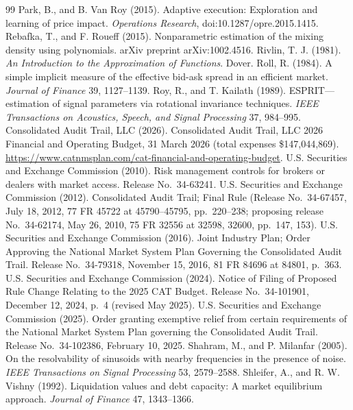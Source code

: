 \documentclass[12pt]{article}
\theoremstyle{definition}
\theoremstyle{remark}
\begin{document}
\begin{thebibliography}{99}
 Park, B., and B. Van Roy (2015). Adaptive execution: Exploration and learning of price impact. \emph{Operations Research}, doi:10.1287/opre.2015.1415.
 Rebafka, T., and F. Roueff (2015). Nonparametric estimation of the mixing density using polynomials. arXiv preprint arXiv:1002.4516.
 Rivlin, T. J. (1981). \emph{An Introduction to the Approximation of Functions}. Dover.
 Roll, R. (1984). A simple implicit measure of the effective bid-ask spread in an efficient market. \emph{Journal of Finance} 39, 1127--1139.
 Roy, R., and T. Kailath (1989). ESPRIT---estimation of signal parameters via rotational invariance techniques. \emph{IEEE Transactions on Acoustics, Speech, and Signal Processing} 37, 984--995.
 Consolidated Audit Trail, LLC (2026). Consolidated Audit Trail, LLC 2026 Financial and Operating Budget, 31 March 2026 (total expenses \$147{,}044{,}869). \url{https://www.catnmsplan.com/cat-financial-and-operating-budget}.
 U.S. Securities and Exchange Commission (2010). Risk management controls for brokers or dealers with market access. Release No.\ 34-63241.
 U.S. Securities and Exchange Commission (2012). Consolidated Audit Trail; Final Rule (Release No.\ 34-67457, July 18, 2012, 77 FR 45722 at 45790--45795, pp.\ 220--238; proposing release No.\ 34-62174, May 26, 2010, 75 FR 32556 at 32598, 32600, pp.\ 147, 153).
 U.S. Securities and Exchange Commission (2016). Joint Industry Plan; Order Approving the National Market System Plan Governing the Consolidated Audit Trail. Release No.\ 34-79318, November 15, 2016, 81 FR 84696 at 84801, p.\ 363.
 U.S. Securities and Exchange Commission (2024). Notice of Filing of Proposed Rule Change Relating to the 2025 CAT Budget. Release No.\ 34-101901, December 12, 2024, p.\ 4 (revised May 2025).
 U.S. Securities and Exchange Commission (2025). Order granting exemptive relief from certain requirements of the National Market System Plan governing the Consolidated Audit Trail. Release No.\ 34-102386, February 10, 2025.
 Shahram, M., and P. Milanfar (2005). On the resolvability of sinusoids with nearby frequencies in the presence of noise. \emph{IEEE Transactions on Signal Processing} 53, 2579--2588.
 Shleifer, A., and R. W. Vishny (1992). Liquidation values and debt capacity: A market equilibrium approach. \emph{Journal of Finance} 47, 1343--1366.

\end{thebibliography}
\end{document}
